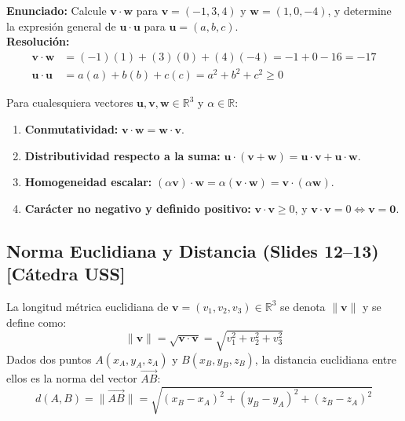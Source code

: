 \documentclass[10pt,letterpaper]{article}
\newcommand{\vu}{\mathbf{u}}
\newcommand{\vv}{\mathbf{v}}
\newcommand{\vw}{\mathbf{w}}
\begin{document}
\begin{cajaEjemplo}
\textbf{Enunciado:} Calcule $\vv \cdot \vw$ para $\vv = (-1, 3, 4)$ y $\vw = (1, 0, -4)$, y determine la expresión general de $\vu \cdot \vu$ para $\vu = (a, b, c)$.\\[0.15cm]
\textbf{Resolución:}
\begin{align*}
\vv \cdot \vw &= (-1)(1) + (3)(0) + (4)(-4) = -1 + 0 - 16 = -17 \\
\vu \cdot \vu &= a(a) + b(b) + c(c) = a^2 + b^2 + c^2 \ge 0
\end{align*}
\end{cajaEjemplo}

\begin{cajaTeorema}
Para cualesquiera vectores $\vu, \vv, \vw \in \mathbb{R}^3$ y $\alpha \in \mathbb{R}$:
\begin{enumerate}
    \item \textbf{Conmutatividad:} $\vv \cdot \vw = \vw \cdot \vv$.
    \item \textbf{Distributividad respecto a la suma:} $\vu \cdot (\vv + \vw) = \vu \cdot \vv + \vu \cdot \vw$.
    \item \textbf{Homogeneidad escalar:} $(\alpha\vv) \cdot \vw = \alpha(\vv \cdot \vw) = \vv \cdot (\alpha\vw)$.
    \item \textbf{Carácter no negativo y definido positivo:} $\vv \cdot \vv \ge 0$, y $\vv \cdot \vv = 0 \iff \vv = \mathbf{0}$.
\end{enumerate}
\end{cajaTeorema}

\subsection{Norma Euclidiana y Distancia (Slides 12--13) [Cátedra USS]}

\begin{cajaDefinicion}
La longitud métrica euclidiana de $\vv = (v_1, v_2, v_3) \in \mathbb{R}^3$ se denota $\|\vv\|$ y se define como:
\[
\|\vv\| = \sqrt{\vv \cdot \vv} = \sqrt{v_1^2 + v_2^2 + v_3^2}
\]
Dados dos puntos $A(x_A, y_A, z_A)$ y $B(x_B, y_B, z_B)$, la distancia euclidiana entre ellos es la norma del vector $\overrightarrow{AB}$:
\[
d(A, B) = \|\overrightarrow{AB}\| = \sqrt{(x_B - x_A)^2 + (y_B - y_A)^2 + (z_B - z_A)^2}
\]
\end{cajaDefinicion}
\end{document}
